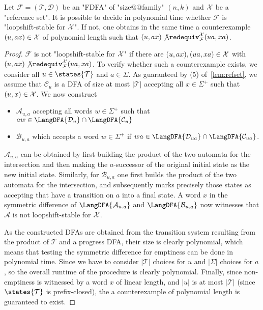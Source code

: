 \documentclass[a4paper,USenglish,cleveref,autoref,thm-restate]{lipics-v2021}
\newcommand{\mc}[1]{\ensuremath{\mathcal{#1}}}
\newcommand{\A}{\mc{A}}
\newcommand{\T}{\mc{T}}
\newcommand{\F}{\mc{F}}
\newcommand{\D}{\mc{D}}
\newcommand{\C}{\mc{C}}
\newcommand{\B}{\mc{B}}
\begin{document}
{\begin{lemma}
    Let $\F = (\T, \D)$ be an "FDFA" of "size@@family" $(n,k)$ and $\mathcal{X}$ be a "reference set".
    It is possible to decide in polynomial time whether $\F$ is "loopshift-stable for $\mathcal{X}$".
    If not, one obtains in the same time a counterexample $(u,ax) \in \mathcal{X}$ of polynomial length such that $(u, ax) \not\redequiv^\X_\F (ua,xa)$.\label{app:lemma:rotationinvariancedecidable}
\end{lemma}
\begin{proof}
  $\F$ is not "loopshift-stable for $\mathcal{X}$" if there are $(u,ax), (ua,xa) \in \mathcal{X}$ with $(u,ax) \not\redequiv^\X_\F (ua,xa)$.
  To verify whether such a counterexample exists, we consider all $u \in \states{\T}$ and $a \in \Sigma$.
  As guaranteed by (5) of~\cref{lem:refset}, we assume that $\C_u$ is a DFA of size at most $|\T|$ accepting all $x \in \Sigma^+$ such that $(u,x) \in \mathcal{X}$.
  We now construct
  \begin{itemize}
    \item $\A_{u,a}$ accepting all words $w \in \Sigma^+$ such that
      $aw \in \LangDFA{\D_u} \cap \LangDFA{\C_u}$
    \item $\B_{u,a}$ which accepts a word $w \in \Sigma^+$ if $wa \in
      \LangDFA{\D_{ua}}\cap \LangDFA{\C_{ua}}$.
  \end{itemize}
  $\A_{u,a}$ can be obtained by first building the product of the two automata for the intersection and then making the $a$-successor of the original initial state as the new initial state.
  Similarly, for $\B_{u,a}$ one first builds the product of the two automata for the intersection, and subsequently marks precisely those states as accepting that have a transition on $a$ into a final state.
  A word $x$ in the symmetric difference of $\LangDFA{\A_{u,a}}$ and $\LangDFA{\B_{u,a}}$ now witnesses that $\A$ is not loopshift-stable for $\mathcal{X}$.
  
  As the constructed DFAs are obtained from the transition system resulting from the product of $\T$ and a progress DFA, their size is clearly polynomial, which means that testing the symmetric difference for emptiness can be done in polynomial time.
  Since we have to consider $|\T|$ choices for $u$ and $|\Sigma|$ choices for $a$, so the overall runtime of the procedure is clearly polynomial.
  Finally, since non-emptiness is witnessed by a word $x$ of linear length, and $|u|$ is at most $|\T|$ (since $\states{\T}$ is prefix-closed), the a counterexample of polynomial length is guaranteed to exist.
\end{proof}

}
\end{document}
